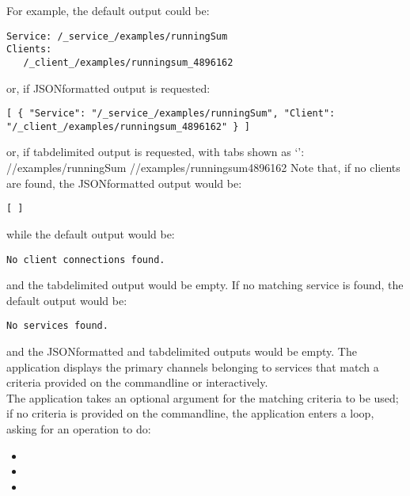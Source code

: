 For example, the default output could be:
\outputBegin
\begin{verbatim}
Service: /_service_/examples/runningSum
Clients:
   /_client_/examples/runningsum_4896162
\end{verbatim}
\outputEnd{}
or, if JSON\longDash{}formatted output is requested:
\outputBegin
\begin{verbatim}
[ { "Service": "/_service_/examples/runningSum", "Client":
"/_client_/examples/runningsum_4896162" } ]
\end{verbatim}
\outputEnd
\condPage{}
or, if tab\longDash{}delimited output is requested, with tabs shown as `\tabSymbol':
\outputBegin{}
/\serviceName/examples/runningSum\pseudotab{}%
/\clientName/examples/runningsum\textunderscore{}4896162
\outputEnd{}
Note that, if no clients are found, the JSON\longDash{}formatted output would be:
\outputBegin
\begin{verbatim}
[ ]
\end{verbatim}
\outputEnd{}
while the default output would be:
\outputBegin
\begin{verbatim}
No client connections found.
\end{verbatim}
\outputEnd{}
and the tab\longDash{}delimited output would be empty.
If no matching service is found, the default output would be:
\outputBegin
\begin{verbatim}
No services found.
\end{verbatim}
\outputEnd{}
and the JSON\longDash{}formatted and tab\longDash{}delimited outputs would be empty.
The application  displays the primary channels belonging to
services that match a criteria provided on the command\longDash{}line or interactively.\\

The application takes an optional argument for the matching criteria to be used; if no
criteria is provided on the command\longDash{}line, the application enters a loop, asking
for an operation to do:
\begin{itemize}
\item{}
\item\exSp{}
\item\exSp{}
\end{itemize}

\insertFullUtilityParameters\\

